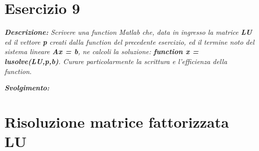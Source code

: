 \section{Esercizio 9}
\textit{\textbf{Descrizione:} Scrivere una function Matlab che, data in ingresso la matrice \textbf{LU} ed il vettore \textbf{p} creati dalla function del precedente esercizio, ed il termine noto del sistema lineare \textbf{Ax = b}, ne calcoli la soluzione: \textbf{function x = lusolve(LU,p,b)}. Curare particolarmente la scrittura e l'efficienza della function.}\newline

\noindent \textit{\textbf{Svolgimento:}}\newline

\section*{Risoluzione matrice fattorizzata LU}

\newpage
